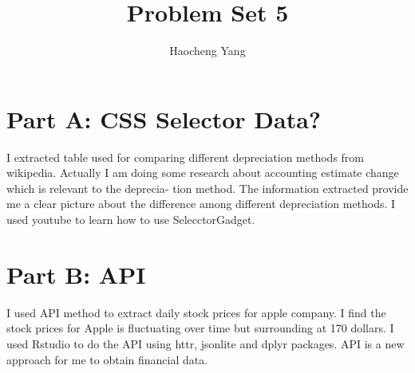 \documentclass{article}
\title{Problem Set 5}
\author{Haocheng Yang}
\begin{document}
\maketitle


\section{Part A: CSS Selector Data? }

I extracted table used for comparing different depreciation methods from wikipedia. Actually 
I am doing some research about accounting estimate change which is relevant to the deprecia-
tion method. The information extracted provide me a clear picture about the difference among
different depreciation methods. I used youtube to learn how to use SelecctorGadget.

\section{Part B: API}
I used API method to extract daily stock prices for apple company. I find the stock prices
for Apple is fluctuating over time but surrounding at 170 dollars. I used Rstudio to do the API using httr, jsonlite and dplyr packages. API is a new approach for me to obtain financial data.
\end{document}
